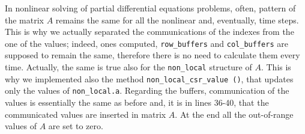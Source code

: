 In nonlinear solving of partial differential equations problems, often, pattern of the matrix $ A $ remains the same for all the nonlinear and, eventually, time steps. This is why we actually separated the communications of the indexes from the one of the values; indeed, ones computed, \texttt{row\_buffers} and \texttt{col\_buffers} are supposed to remain the same, therefore there is no need to calculate them every time. Actually, the same is true also for the \texttt{non\_local} structure of $ A $. This is why we implemented also the method \texttt{non\_local\_csr\_value ()}, that updates only the values of \texttt{non\_local.a}. Regarding the buffers, communication of the values is essentially the same as before and, it is in lines 36-40, that the communicated values are inserted in matrix $ A $. At the end all the out-of-range values of $ A $ are set to zero.\\
